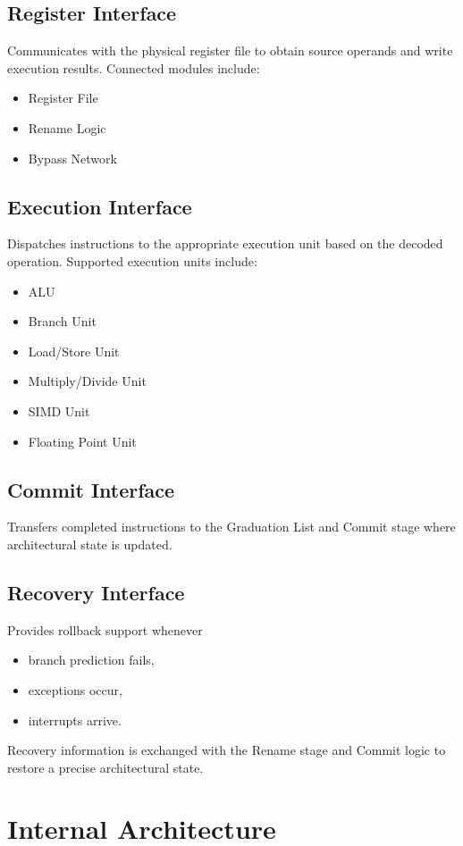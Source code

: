 \subsection*{Register Interface}
Communicates with the physical register file to obtain source operands and write execution
results.
Connected modules include:
\begin{itemize}
  \item Register File
  \item Rename Logic
  \item Bypass Network
\end{itemize}

\subsection*{Execution Interface}
Dispatches instructions to the appropriate execution unit based on the decoded operation.
Supported execution units include:
\begin{itemize}
  \item ALU
  \item Branch Unit
  \item Load/Store Unit
  \item Multiply/Divide Unit
  \item SIMD Unit
  \item Floating Point Unit
\end{itemize}

\subsection*{Commit Interface}
Transfers completed instructions to the Graduation List and Commit stage where architectural
state is updated.

\subsection*{Recovery Interface}
Provides rollback support whenever
\begin{itemize}
  \item branch prediction fails,
  \item exceptions occur,
  \item interrupts arrive.
\end{itemize}
Recovery information is exchanged with the Rename stage and Commit logic to restore a
precise architectural state.

\section{Internal Architecture}

